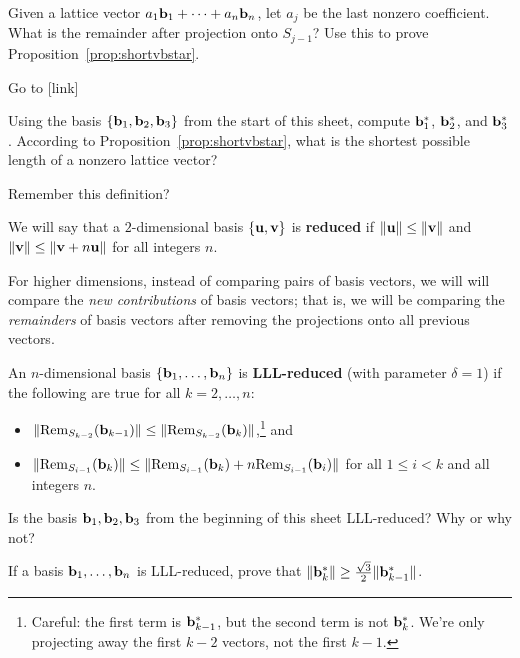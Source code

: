 \begin{explor}
	Given a lattice vector $a_1\mathbf{b}_1+\cdots+a_n\mathbf{b}_n$, let $a_j$ be the last nonzero coefficient. What is the remainder after projection onto $S_{j-1}$? Use this to prove Proposition~\ref{prop:shortvbstar}.
\end{explor}

Go to [link] 

\begin{explor}
	Using the basis $\{\mathbf{b}_1,\mathbf{b}_2,\mathbf{b}_3\}$ from the start of this sheet, compute $\mathbf{b}_1^*$, $\mathbf{b}_2^*$, and $\mathbf{b}_3^*$. According to Proposition~\ref{prop:shortvbstar}, what is the shortest possible length of a nonzero lattice vector?
\end{explor}

Remember this definition?
\begin{defn}
	We will say that a $2$-dimensional basis $\{\mathbf{u},\mathbf{v}\}$ is \textbf{reduced} if $\|\mathbf{u}\|\leq\|\mathbf{v}\|$ and $\|\mathbf{v}\|\leq\|\mathbf{v}+n\mathbf{u}\|$ for all integers $n$.
\end{defn}
For higher dimensions, instead of comparing pairs of basis vectors, we will will compare the \emph{new contributions} of basis vectors; that is, we will be comparing the \emph{remainders} of basis vectors after removing the projections onto all previous vectors. 
\begin{defn}
	An $n$-dimensional basis $\{\mathbf{b}_1,\ldots,\mathbf{b}_n\}$ is \textbf{LLL-reduced} (with parameter $\delta=1$) if the following are true for all $k=2,\ldots,n$:
	\begin{itemize}
		\item $\|\text{Rem}_{S_{k-2}}(\mathbf{b}_{k-1})\|\leq\|\text{Rem}_{S_{k-2}}(\mathbf{b}_k)\|$,\footnote{Careful: the first term is $\mathbf{b}_{k-1}^*$, but the second term is not $\mathbf{b}_k^*$. We're only projecting away the first $k-2$ vectors, not the first $k-1$.} and
		\item $\|\text{Rem}_{S_{i-1}}(\mathbf{b}_k)\|\leq\|\text{Rem}_{S_{i-1}}(\mathbf{b}_k)+n\text{Rem}_{S_{i-1}}(\mathbf{b}_i)\|$ for all $1\leq i< k$ and all integers $n$.		
	\end{itemize}
\end{defn}

\begin{explor}
	Is the basis $\mathbf{b}_1,\mathbf{b}_2,\mathbf{b}_3$ from the beginning of this sheet LLL-reduced? Why or why not?
\end{explor}

\begin{explor}
	If a basis $\mathbf{b}_1,\ldots,\mathbf{b}_n$ is LLL-reduced, prove that $\|\mathbf{b}_k^*\|\geq\frac{\sqrt{3}}{2}\|\mathbf{b}_{k-1}^*\|$.
\end{explor}

